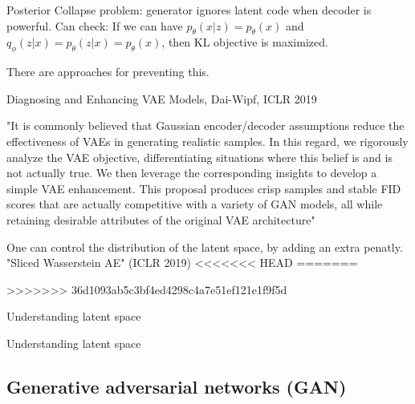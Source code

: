 \documentclass[english]{article}
\begin{document}
\item Posterior Collapse problem: generator ignores latent code when decoder is powerful. Can check: If we can have $p_\theta(x|z) = p_\theta(x)$ and $q_\phi(z|x)=p_\theta(z|x)=p_\theta(x)$, then KL objective is maximized. 

There are approaches for preventing this. 

\item Diagnosing and Enhancing VAE Models, Dai-Wipf, ICLR 2019

"It is commonly believed that Gaussian encoder/decoder assumptions reduce the
effectiveness of VAEs in generating realistic samples. In this regard, we rigorously analyze
the VAE objective, differentiating situations where this belief is and is not actually true.
We then leverage the corresponding insights to develop a simple VAE enhancement. This proposal
produces crisp samples and stable FID scores that are actually competitive with a variety
of GAN models, all while retaining desirable attributes of the original VAE architecture"

\item One can control the distribution of the latent space, by adding an extra penatly. "Sliced Wasserstein AE" (ICLR 2019)
<<<<<<< HEAD
=======

>>>>>>> 36d1093ab5c3bf4ed4298c4a7e51ef121e1f9f5d


\item Understanding latent space

\item Understanding latent space

\eenum 

 
\subsection{Generative adversarial networks (GAN)}
\end{document}
